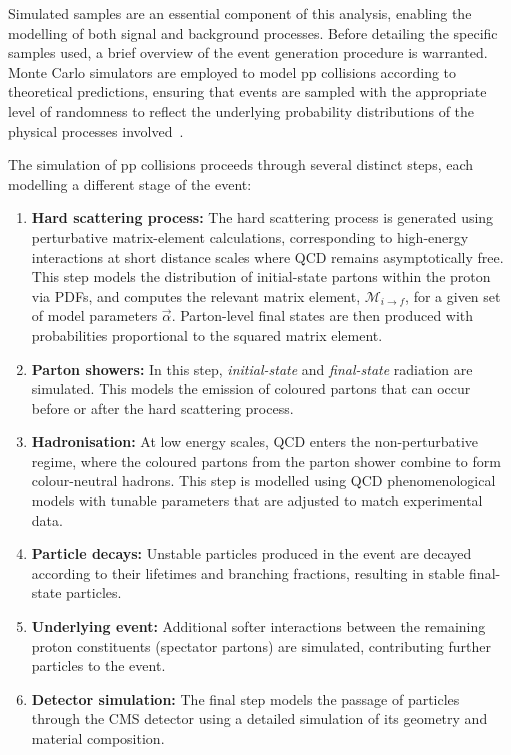 Simulated samples are an essential component of this analysis, enabling the modelling of both signal and background processes. Before detailing the specific samples used, a brief overview of the event generation procedure is warranted. Monte Carlo simulators are employed to model pp collisions according to theoretical predictions, ensuring that events are sampled with the appropriate level of randomness to reflect the underlying probability distributions of the physical processes involved~\cite{PYTHIA,EventGenerators}.

The simulation of pp collisions proceeds through several distinct steps, each modelling a different stage of the event:

\begin{enumerate}
    \item \textbf{Hard scattering process:} The hard scattering process is generated using perturbative matrix-element calculations, corresponding to high-energy interactions at short distance scales where QCD remains asymptotically free. This step models the distribution of initial-state partons within the proton via \acp{PDF}, and computes the relevant matrix element, $\mathcal{M}_{i \to f}$, for a given set of model parameters $\vec{\alpha}$. Parton-level final states are then produced with probabilities proportional to the squared matrix element.

    \item \textbf{Parton showers:} In this step, \textit{initial-state} and \textit{final-state} radiation are simulated. This models the emission of coloured partons that can occur before or after the hard scattering process.

    \item \textbf{Hadronisation:} At low energy scales, QCD enters the non-perturbative regime, where the coloured partons from the parton shower combine to form colour-neutral hadrons. This step is modelled using QCD phenomenological models with tunable parameters that are adjusted to match experimental data.

    \item \textbf{Particle decays:} Unstable particles produced in the event are decayed according to their lifetimes and branching fractions, resulting in stable final-state particles.

    \item \textbf{Underlying event:} Additional softer interactions between the remaining proton constituents (spectator partons) are simulated, contributing further particles to the event.

    \item \textbf{Detector simulation:} The final step models the passage of particles through the CMS detector using a detailed simulation of its geometry and material composition.
\end{enumerate}

